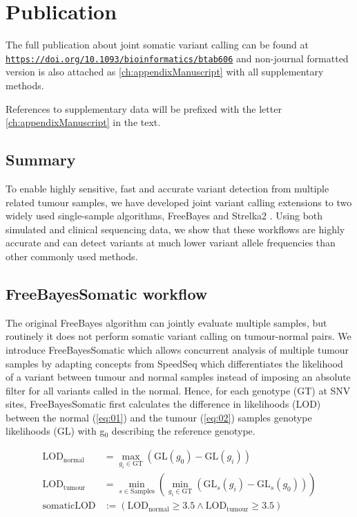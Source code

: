 \section{Publication}
\label{variantcalling-sec:publication}

The full publication about joint somatic variant calling can be found at \href{https://doi.org/10.1093/bioinformatics/btab606}{\nolinkurl{https://doi.org/10.1093/bioinformatics/btab606}} and non-journal formatted version is also attached as \autoref{ch:appendixManuscript} with all supplementary methods.

References to supplementary data will be prefixed with the letter \ref{ch:appendixManuscript} in the text.

\subsection{Summary}
To enable highly sensitive, fast and accurate variant detection from multiple related tumour samples, we have developed joint variant calling extensions to two widely used single-sample algorithms, FreeBayes \parencite{Garrison2012} and Strelka2 \parencite{Kim2018}. Using both simulated and clinical sequencing data, we show that these workflows are highly accurate and can detect variants at much lower variant allele frequencies than other commonly used methods.

\subsection{FreeBayesSomatic workflow}
The original FreeBayes algorithm can jointly evaluate multiple samples, but routinely it does not perform somatic variant calling on tumour-normal pairs. We introduce FreeBayesSomatic which allows concurrent analysis of multiple tumour samples by adapting concepts from SpeedSeq \parencite{Chiang2015} which differentiates the likelihood of a variant between tumour and normal samples instead of imposing an absolute filter for all variants called in the normal. Hence, for each genotype (GT) at SNV sites, FreeBayesSomatic first calculates the difference in likelihoods (LOD) between the normal (\autoref{eq:01}) and the tumour (\autoref{eq:02}) samples genotype likelihoods (GL) with g$_{0}$ describing the reference genotype.


\begin{align}
\text{LOD}_{\text{normal}} &= \max_{g_i \in \text{GT}} \left( \text{GL}(g_0) - \text{GL}(g_i) \right) \label{eq:01}\\
\text{LOD}_{\text{tumour}} &= \min_{s \in \text{Samples}} \left( \min_{g_i \in \text{GT}} \left( \text{GL}_s(g_i) - \text{GL}_s(g_0) \right) \right) \label{eq:02}\\
\text{somaticLOD} & := \left( \text{LOD}_{\text{normal}} \geq 3.5 \land \text{LOD}_{\text{tumour}} \geq 3.5 \right) \label{eq:03}
\end{align}

